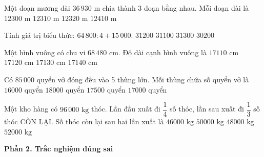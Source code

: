 \begin{ex} %
Một đoạn mương dài $36\,930\text{ m}$ chia thành 3 đoạn bằng nhau. Mỗi đoạn dài là
\choice
{$12300\text{ m}$}
{\True $12310\text{ m}$}
{$12320\text{ m}$}
{$12410\text{ m}$}
\end{ex}

\begin{ex} %
Tính giá trị biểu thức: $64\,800 : 4 + 15\,000$.
\choice
{\True $31200$}
{$31100$}
{$31300$}
{$30200$}
\end{ex}

\begin{ex} %
Một hình vuông có chu vi $68\,480\text{ cm}$. Độ dài cạnh hình vuông là
\choice
{$17110\text{ cm}$}
{\True $17120\text{ cm}$}
{$17130\text{ cm}$}
{$17140\text{ cm}$}
\end{ex}

\begin{ex} %
Có $85\,000$ quyển vở đóng đều vào 5 thùng lớn. Mỗi thùng chứa số quyển vở là
\choice
{$16000$ quyển}
{$18000$ quyển}
{$17500$ quyển}
{\True $17000$ quyển}
\end{ex}

\begin{ex} %
Một kho hàng có $96\,000\text{ kg}$ thóc. Lần đầu xuất đi $\dfrac{1}{4}$ số thóc, lần sau xuất đi $\dfrac{1}{3}$ số thóc CÒN LẠI. Số thóc còn lại sau hai lần xuất là
\choice
{$46000\text{ kg}$}
{$50000\text{ kg}$}
{\True $48000\text{ kg}$}
{$52000\text{ kg}$}
\end{ex}

\textbf{Phần 2. Trắc nghiệm đúng sai}

